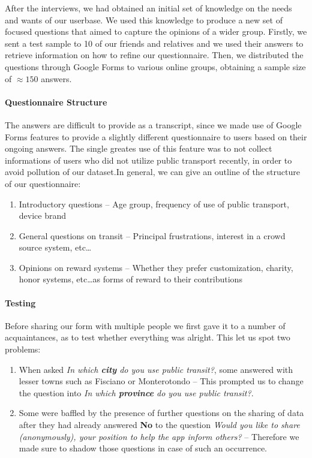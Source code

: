 \documentclass[a4paper, 11pt]{report}
\begin{document}
After the interviews, we had obtained an initial set of knowledge on the needs and wants of
our userbase. We used this knowledge to produce a new set of focused questions that aimed
to capture the opinions of a wider group. Firstly, we sent a test sample to 10 of our friends
and relatives and we used their answers to retrieve information on how to refine our questionnaire.
Then, we distributed the questions through Google Forms to various online groups,
obtaining a sample size of $\approx150$ answers.

\paragraph{Questionnaire Structure}

The answers are difficult to provide as a transcript, since we made use of Google Forms
features to provide a slightly different questionnaire to users based on their ongoing answers.
The single greates use of this feature was to not collect informations of users who did not
utilize public transport recently, in order to avoid pollution of our dataset.\@ In
general, we can give an outline of the structure of our questionnaire:

\begin{enumerate}
	\item Introductory questions -- Age group, frequency of use of public transport, device brand
	\item General questions on transit -- Principal frustrations, interest in a crowd source system, etc\dots
	\item Opinions on reward systems -- Whether they prefer customization, charity, honor systems, etc\dots\@ as
	      forms of reward to their contributions
\end{enumerate}

\paragraph{Testing}
Before sharing our form with multiple people we first gave it to a number of acquaintances,
as to test whether everything was alright. This let us spot two problems:
\begin{enumerate}
	\item When asked \emph{In which \textbf{city} do you use public transit?}, some answered
	      with lesser towns such as Fisciano or Monterotondo -- This prompted us to change the
	      question into \emph{In which \textbf{province} do you use public transit?}.
	\item Some were baffled by the presence of further questions on the sharing of data after
	      they had already answered \textbf{No} to the question \emph{Would you like to share
		      (anonymously), your position to help the app inform others?} -- Therefore we made sure to
	      shadow those questions in case of such an occurrence.
\end{enumerate}
\end{document}
